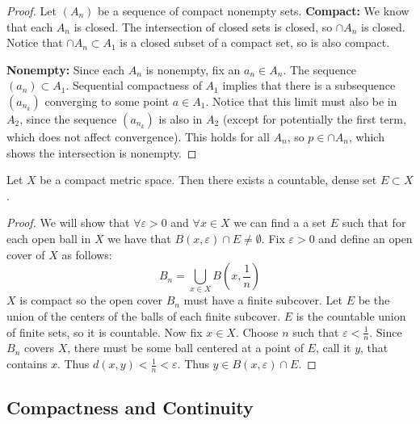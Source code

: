\documentclass[11pt]{article}
\numberwithin{equation}{section}
\theoremstyle{definition}
\theoremstyle{definition}
\def\ss{\subset}
\newcommand{\1}{\mathbbm 1}
\newcommand{\e}{\varepsilon}
\begin{document}
\begin{theorem}
\end{theorem}
\begin{proof}
	Let $(A_n)$ be a sequence of compact nonempty sets. 
	\textbf{Compact:} We know that each $A_n$ is closed. The intersection of closed sets is closed, so $\cap A_n$ is closed. Notice that $\cap A_n \ss A_1$ is a closed subset of a compact set, so is also compact. 

	\textbf{Nonempty:} Since each $A_n$ is nonempty, fix an $a_n \in A_n$. The sequence $(a_n) \ss A_1$. Sequential compactness of $A_1$ implies that there is a subsequence $(a_{n_k})$ converging to some point $a \in A_1$. Notice that this limit must also be in $A_2$, since the sequence $(a_{n_k})$ is also in $A_2$ (except for potentially the first term, which does not affect convergence). This holds for all $A_n$, so $p \in \cap A_n$, which shows the intersection is nonempty.   
\end{proof}


\begin{theorem}[]
	Let $X$ be a compact metric space. Then there exists a countable, dense set $E \subset X$. 
\end{theorem}
\begin{proof}
	We will show that $\forall \e >0$ and $\forall x \in X$ we can find a a set $E$ such that for each open ball in $X$ we have that $B(x,\e) \cap E \neq \emptyset$. Fix $\e > 0$ and define an open cover of $X$ as follows:
	\begin{equation}
		B_n = \bigcup_{x \in X} B(x,\frac{1}{n})
	\end{equation}
	$X$ is compact so the open cover $B_n$ must have a finite subcover. Let $E$ be the union of the centers of the balls of each finite subcover. $E$ is the countable union of finite sets, so it is countable. Now fix $x \in X$. Choose $n$ such that $\e < \frac{1}{n}$. Since $B_n$ covers $X$, there must be some ball centered at a point of $E$, call it $y$, that contains $x$. Thus $d(x,y) < \frac{1}{n} < \e$. Thus $y \in B(x,\e) \cap E$. 
\end{proof}


\subsection{Compactness and Continuity}
\end{document}
